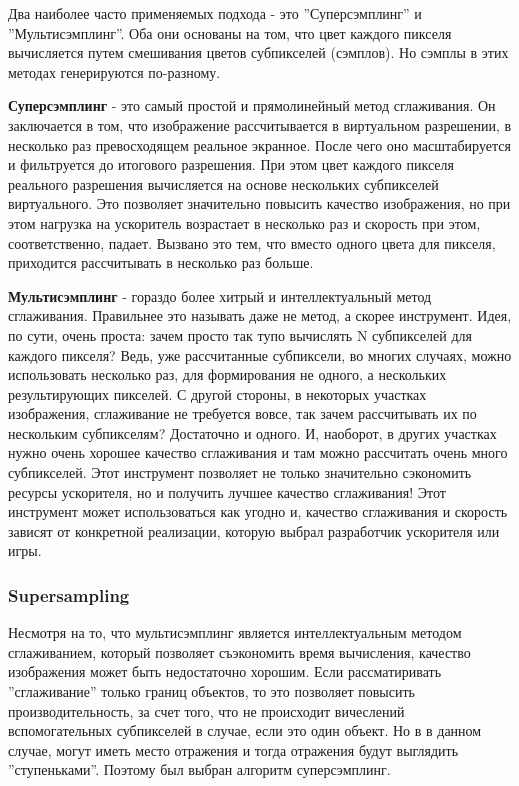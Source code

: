 \documentclass[12pt, a4paper]{article}
\begin{document}
Два наиболее часто применяемых подхода - это ''Суперсэмплинг'' и ''Мультисэмплинг''. Оба они основаны на том, что цвет каждого пикселя вычисляется путем смешивания цветов субпикселей (сэмплов). Но сэмплы в этих методах генерируются по-разному.

\textbf{Суперсэмплинг} - это самый простой и прямолинейный метод сглаживания. Он заключается в том, что изображение рассчитывается в виртуальном разрешении, в несколько раз превосходящем реальное экранное. После чего оно масштабируется и фильтруется до итогового разрешения. При этом цвет каждого пикселя реального разрешения вычисляется на основе нескольких субпикселей виртуального. Это позволяет значительно повысить качество изображения, но при этом нагрузка на ускоритель возрастает в несколько раз и скорость при этом, соответственно, падает. Вызвано это тем, что вместо одного цвета для пикселя, приходится рассчитывать в несколько раз больше.

\textbf{Мультисэмплинг} - гораздо более хитрый и интеллектуальный метод сглаживания. Правильнее это называть даже не метод, а скорее инструмент. Идея, по сути, очень проста: зачем просто так тупо вычислять N субпикселей для каждого пикселя? Ведь, уже рассчитанные субпиксели, во многих случаях, можно использовать несколько раз, для формирования не одного, а нескольких результирующих пикселей. С другой стороны, в некоторых участках изображения, сглаживание не требуется вовсе, так зачем рассчитывать их по нескольким субпикселям? Достаточно и одного. И, наоборот, в других участках нужно очень хорошее качество сглаживания и там можно рассчитать очень много субпикселей. Этот инструмент позволяет не только значительно сэкономить ресурсы ускорителя, но и получить лучшее качество сглаживания! Этот инструмент может использоваться как угодно и, качество сглаживания и скорость зависят от конкретной реализации, которую выбрал разработчик ускорителя или игры.

\subsubsection{Supersampling}
Несмотря на то, что мультисэмплинг является интеллектуальным методом сглаживанием, который позволяет съэкономить время вычисления, качество изображения может быть недостаточно хорошим. Если рассматиривать ''сглаживание'' только границ объектов,  то это позволяет повысить производительность, за счет того, что не происходит вичеслений вспомогательных субпикселей в случае, если это один объект. Но в в данном случае, могут иметь место отражения и тогда отражения будут выглядить ''ступеньками''. Поэтому был выбран алгоритм суперсэмплинг. 
\end{document}
